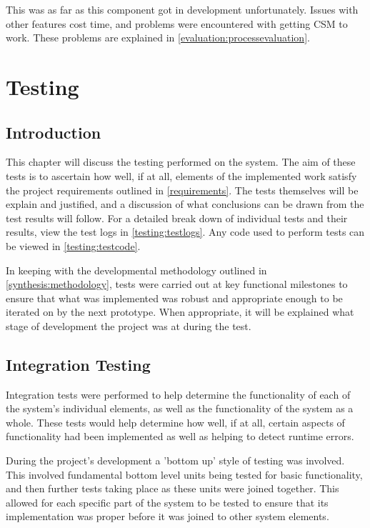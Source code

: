 				This was as far as this component got in development unfortunately. Issues with other features cost time, and problems were encountered with getting CSM to work. These problems are explained in \ref{evaluation:processevaluation}.
				
	
	\chapter{Testing}
		\section{Introduction}
		This chapter will discuss the testing performed on the system. The aim of these tests is to ascertain how well, if at all, elements of the implemented work satisfy the project requirements outlined in \ref{requirements}. The tests themselves will be explain and justified, and a discussion of what conclusions can be drawn from the test results will follow. For a detailed break down of individual tests and their results, view the test logs in \ref{testing:testlogs}. Any code used to perform tests can be viewed in \ref{testing:testcode}.
		
		In keeping with the developmental methodology outlined in \ref{synthesis:methodology}, tests were carried out at key functional milestones to ensure that what was implemented was robust and appropriate enough to be iterated on by the next prototype. When appropriate, it will be explained what stage of development the project was at during the test.
		
		
		
		
		
		
	
		\section{Integration Testing}
		Integration tests were performed to help determine the functionality of each of the system's individual elements, as well as the functionality of the system as a whole. These tests would help determine how well, if at all, certain aspects of functionality had been implemented as well as helping to detect runtime errors.
		
		During the project's development a 'bottom up' style of testing was involved. This involved fundamental bottom level units being tested for basic functionality, and then further tests taking place as these units were joined together. This allowed for each specific part of the system to be tested to ensure that its implementation was proper before it was joined to other system elements.
	
